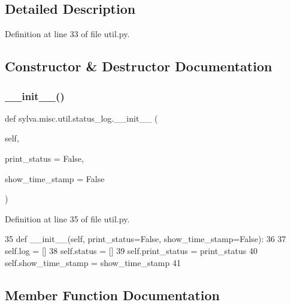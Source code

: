 \subsection{Detailed Description}


Definition at line 33 of file util.\+py.



\subsection{Constructor \& Destructor Documentation}
\mbox{\label{classsylva_1_1misc_1_1util_1_1status__log_ab7c946f90680f9a4460404cf7c64f126}} 
\subsubsection{\texorpdfstring{\+\_\+\+\_\+init\+\_\+\+\_\+()}{\_\_init\_\_()}}
{\footnotesize\ttfamily def sylva.\+misc.\+util.\+status\+\_\+log.\+\_\+\+\_\+init\+\_\+\+\_\+ (\begin{DoxyParamCaption}\item[{}]{self,  }\item[{}]{print\+\_\+status = {\ttfamily False},  }\item[{}]{show\+\_\+time\+\_\+stamp = {\ttfamily False} }\end{DoxyParamCaption})}



Definition at line 35 of file util.\+py.


\begin{DoxyCode}
35     \textcolor{keyword}{def }\_\_init\_\_(self, print\_status=False, show\_time\_stamp=False):
36 
37         self.log = []
38         self.status = []
39         self.print\_status = print\_status
40         self.show\_time\_stamp = show\_time\_stamp
41 
\end{DoxyCode}


\subsection{Member Function Documentation}
\mbox{\label{classsylva_1_1misc_1_1util_1_1status__log_ab98f2dd8f3108204d97d0415ab838f96}} 
